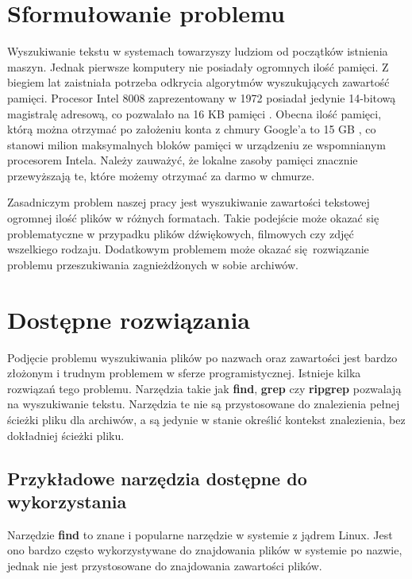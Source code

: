 \section{Sformułowanie problemu}
Wyszukiwanie tekstu w systemach towarzyszy ludziom od początków istnienia maszyn.
Jednak pierwsze komputery nie posiadały ogromnych ilość pamięci. Z biegiem lat
zaistniała potrzeba odkrycia algorytmów wyszukujących zawartość pamięci. 
Procesor Intel 8008 zaprezentowany w 1972 posiadał jedynie 14-bitową magistralę
adresową, co pozwalało na 16 KB pamięci \cite{bib:internet:Intel8008}. 
Obecna ilość pamięci, którą można otrzymać po założeniu konta z chmury Google'a to 15 GB
\cite{bib:internet:GoogleCloud}, co stanowi milion maksymalnych bloków pamięci w 
urządzeniu ze wspomnianym procesorem Intela. Należy zauważyć, że lokalne zasoby
 pamięci znacznie przewyższają te, które możemy otrzymać za darmo w chmurze.

Zasadniczym problem naszej pracy jest wyszukiwanie zawartości tekstowej
ogromnej ilość plików w różnych formatach. Takie podejście może okazać się 
problematyczne \newline w przypadku plików dźwiękowych, filmowych czy zdjęć
wszelkiego rodzaju. Dodatkowym problemem może okazać się rozwiązanie problemu
przeszukiwania zagnieżdżonych w sobie archiwów.

\section{Dostępne rozwiązania} %

Podjęcie problemu wyszukiwania plików po nazwach oraz zawartości jest bardzo
złożonym i trudnym problemem w sferze programistycznej. Istnieje kilka rozwiązań
tego problemu. Narzędzia takie jak \textbf{find}, \textbf{grep} czy \textbf{ripgrep} 
\cite{bib:internet:ripgrep} pozwalają na wyszukiwanie tekstu. Narzędzia te nie 
są przystosowane do znalezienia pełnej ścieżki pliku dla archiwów, a są jedynie
w stanie określić kontekst znalezienia, bez dokładniej ścieżki pliku.

\subsection{Przykładowe narzędzia dostępne do wykorzystania}

Narzędzie \textbf{find} to znane i popularne narzędzie w systemie z jądrem Linux.
Jest ono bardzo często wykorzystywane do znajdowania plików w systemie po nazwie, 
jednak nie jest przystosowane do znajdowania zawartości plików.

